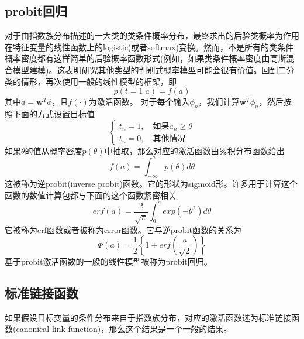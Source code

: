 \subsection*{probit回归}
对于由指数族分布描述的一大类的类条件概率分布，最终求出的后验类概率为作用在特征变量的线性函数上的logistic(或者softmax)变换。然而，不是所有的类条件概率密度都有这样简单的后验概率函数形式(例如，如果类条件概率密度由高斯混合模型建模)。这表明研究其他类型的判别式概率模型可能会很有价值。回到二分类的情形，再次使用一般的线性模型的框架，即
\begin{equation}
	p(t=1|a)=f(a)
\end{equation}
其中$a=\boldsymbol{w}^T\phi$，且$f(\cdot)$为激活函数。
对于每个输入$\phi_n$，我们计算$\boldsymbol{w}^T\phi_n$，然后按照下面的方式设置目标值
\begin{equation}
	\begin{cases}
	t_n=1,\quad \text{如果}a_n\geqslant \theta\\
	t_n=0,\quad \text{其他情况}
	\end{cases}
\end{equation}
如果$\theta$的值从概率密度$p(\theta)$中抽取，那么对应的激活函数由累积分布函数给出
\begin{equation}
	f(a)=\int_{-\infty}^ap(\theta)d\theta
\end{equation}
这被称为逆probit(inverse probit)函数。它的形状为sigmoid形。许多用于计算这个函数的数值计算包都与下面的这个函数紧密相关
\begin{equation}
	erf(a)=\frac{2}{\sqrt{\pi}}\int_0^aexp(-\theta^2)d\theta
\end{equation}
它被称为erf函数或者被称为error函数。它与逆probit函数的关系为
\begin{equation}
	\Phi(a)=\frac{1}{2}\left\{1+erf\left(\frac{a}{\sqrt{2}} \right) \right\}
\end{equation}
基于probit激活函数的一般的线性模型被称为probit回归。
\subsection*{标准链接函数}
如果假设目标变量的条件分布来自于指数族分布，对应的激活函数选为标准链接函数(canonical link function)，那么这个结果是一个一般的结果。

